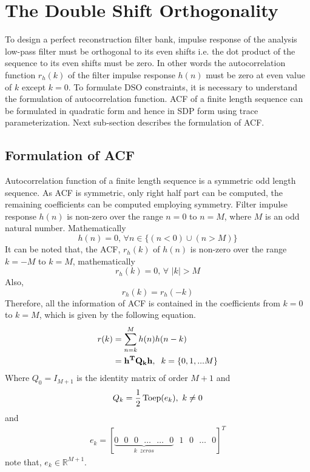 \section{The Double Shift Orthogonality}
\label{sec: The Double Shift Orthogonality}
To design a perfect reconstruction filter bank, impulse response of the analysis low-pass filter  must be orthogonal to its even shifts i.e. the dot product of the sequence to its even shifts must be zero. In other words the autocorrelation function $r_h(k)$ of the filter impulse response $h(n)$ must be zero at even value of $k$ except $k=0$.
To formulate DSO constraints, it is necessary to understand the formulation of autocorrelation function. ACF of a finite length sequence can be formulated in quadratic form \cite{AccurateComputation} and hence in SDP form using trace parameterization. Next sub-section describes the formulation of ACF.
\subsection{Formulation of ACF}
\label{sub: Formulation of ACF}
Autocorrelation function of a finite length sequence is a symmetric odd length sequence. As ACF is symmetric, only right half part can be computed, the remaining coefficients can be computed employing symmetry. Filter impulse response $h(n)$ is non-zero over the range $n=0$ to $n=M$, where $M$ is an odd natural number. Mathematically
\begin{equation*}
h(n)=0 ,\, \forall n \in \{(n < 0) \cup (n > M)\}
\end{equation*}
It can be noted that, the ACF, $r_h(k)$ of $h(n)$ is non-zero over the range $k=-M$ to $k=M$, mathematically   
\begin{equation*}
r_h(k)=0 ,\, \forall \,\, |k| > M
\end{equation*}
Also,
$$r_h(k) = r_h(-k)$$
Therefore, all the information of ACF is contained in the coefficients from $k=0$ to $k=M$, which is given by the following equation.
\begin{eqnarray}
\label{eq: ACF}
\begin{aligned}
r(k) &= \sum_{n=k}^{M} h(n)h(n-k)\\
     &= \mathbf{{h^T}{Q_k}h},\hspace{0.2cm} k=\left\{0,1,...M\right\}
\end{aligned}
\end{eqnarray}
Where $Q_0 = I_{M+1}$ is the identity matrix of order $M+1$
	and
	\begin{eqnarray}
	\label{eq: DSO matrix}
	Q_k = \frac{1}{2} \operatorname{Toep}(e_k),\,\, k\ne 0
	\end{eqnarray}
	and
	\begin{eqnarray}
	e_k = 
	[
	\underbrace{0 \,\,\,\, 0  \,\,\,\, 0 \,\,\,\, \ldots \,\,\,\, \ldots \,\,\,\, 0}_{k \,\,\, zeros} \,\,\,\, 1 \,\,\,\, 0 \,\,\,\, \ldots \,\,\,\, 0  
	]^T
	\end{eqnarray}
	note that, $e_k \in \mathbb{R}^{M+1}$.
	
